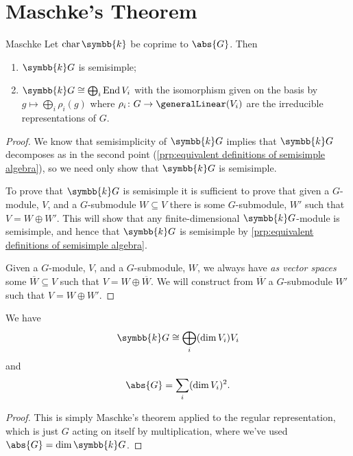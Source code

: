 \documentclass[fleqn]{NotesClass}
\renewcommand{\field}{\symbb{k}}
\DeclareMathOperator{\End}{End}
\newcommand{\isomorphic}{\cong}
\DeclareMathOperator{\Char}{char}
\begin{document}
    \section{Maschke's Theorem}
    \begin{thm}{Maschke}{}
        Let \(\Char \field\) be coprime to \(\abs{G}\).
        Then
        \begin{enumerate}
            \item \(\field G\) is semisimple;
            \item \(\field G \isomorphic \bigoplus_i \End V_i\) with the isomorphism given on the basis by \(g \mapsto \bigoplus_i \rho_i(g)\) where \(\rho_i \colon G \to \generalLinear(V_i)\) are the irreducible representations of \(G\).
        \end{enumerate}
        \begin{proof}
            We know that semisimplicity of \(\field G\) implies that \(\field G\) decomposes as in the second point (\cref{prp:equivalent definitions of semisimple algebra}), so we need only show that \(\field G\) is semisimple.
            
            To prove that \(\field G\) is semisimple it is sufficient to prove that given a \(G\)-module, \(V\), and a \(G\)-submodule \(W \subseteq V\) there is some \(G\)-submodule, \(W'\) such that \(V = W \oplus W'\).
            This will show that any finite-dimensional \(\field G\)-module is semisimple, and hence that \(\field G\) is semisimple by \cref{prp:equivalent definitions of semisimple algebra}.
            
            Given a \(G\)-module, \(V\), and a \(G\)-submodule, \(W\), we always have \emph{as vector spaces} some \(\overbar{W} \subseteq V\) such that \(V = W \oplus \overbar{W}\).
            We will construct from \(\overbar{W}\) a \(G\)-submodule \(W'\) such that \(V = W \oplus W'\).
        \end{proof}
    \end{thm}
    
    \begin{crl}{}{}
        We have
        \begin{equation}
            \field G \isomorphic \bigoplus_i (\dim V_i) V_i
        \end{equation}
        and
        \begin{equation}
            \abs{G} = \sum_i (\dim V_i)^2.
        \end{equation}
        \begin{proof}
            This is simply Maschke's theorem applied to the regular representation, which is just \(G\) acting on itself by multiplication, where we've used \(\abs{G} = \dim \field G\).
        \end{proof}
    \end{crl}
    
%	

    \backmatter
    \renewcommand{\glossaryname}{Acronyms}
    \printglossary[acronym]
    \printindex
\end{document}
